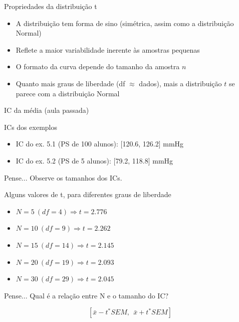 \documentclass{beamer}
\begin{document}
\begin{frame}{Propriedades da distribuição t}
  \begin{itemize}
  \item A distribuição tem forma de sino (simétrica, assim como a
    distribuição Normal)
  \item Reflete a maior variabilidade inerente às amostras pequenas
  \item O formato da curva depende do tamanho da amostra $n$
  \item Quanto mais graus de liberdade (df $\approx$ dados), mais a distribuição
    $t$ se parece com a distribuição Normal
  \end{itemize}
\end{frame}



\begin{frame}{IC da média (aula passada)}
  \begin{exampleblock}{ICs dos exemplos}
    \begin{itemize}
    \item IC do ex. 5.1 (PS de 100 alunos): [120.6, 126.2] mmHg
    \item IC do ex. 5.2 (PS de   5 alunos): [79.2, 118.8] mmHg
    \end{itemize}
  \end{exampleblock}
  \begin{block}{Pense...}
    Observe os tamanhos dos ICs.
  \end{block}
\end{frame}

\begin{frame}{Alguns valores de t, para diferentes graus de liberdade}
  \begin{itemize}
  \item $N = 5\ (df = 4) \Rightarrow t = 2.776$
  \item $N = 10\ (df = 9) \Rightarrow t = 2.262$
  \item $N = 15\ (df = 14) \Rightarrow t = 2.145$
  \item $N = 20\ (df = 19) \Rightarrow t = 2.093$
  \item $N = 30\ (df = 29) \Rightarrow t = 2.045$
  \end{itemize}
  \begin{block}{Pense...}
    Qual é a relação entre N e o tamanho do IC?

    \begin{displaymath}
      \left[ \bar{x} - t^{*} SEM,\ \ \bar{x} + t^{*} SEM \right]
    \end{displaymath}
  \end{block}
\end{frame}
\end{document}
